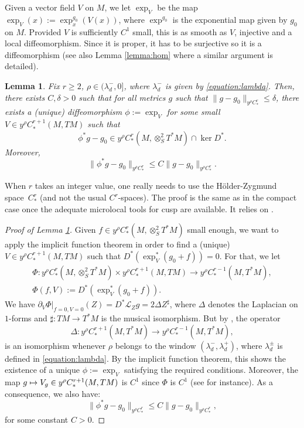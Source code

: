 \documentclass[10pt]{amsart}
\newcommand\mto{\mathchoice{\longmapsto}{\mapsto}{\mapsto}{\mapsto}}
\newcommand{\mc}{\mathcal}
\theoremstyle{plain}
\newtheorem{lemma}{Lemma}[section]
\theoremstyle{definition}
\begin{document}
Given a vector field $V$ on $M$, we let $\exp_V$ be the map $\exp_V(x) := \exp_x^{g_0}(V(x))$, where $\exp^{g_0}$ is the exponential map given by $g_0$ on $M$. Provided $V$ is sufficiently $C^1$ small, this is as smooth as $V$, injective and a local diffeomorphism. Since it is proper, it has to be surjective so it is a diffeomorphism (see also Lemma \ref{lemma:hom} where a similar argument is detailed).

\begin{lemma}
\label{lemma:solenoidal-reduction}
Fix $r \geq 2$, $\rho \in (\lambda_d^-,0]$, where $\lambda_d^-$ is given by \eqref{equation:lambda}. Then, there exists $C, \delta > 0$ such that for all metrics $g$ such that $\|g-g_0\|_{y^{\rho}C^r_*} \leq \delta$, there exists a (unique) diffeomorphism $\phi := \exp_V$ for some small $V \in y^{\rho}C^{r+1}_*(M,TM)$ such that
\[
\phi^*g-g_0 \in y^{\rho}C^r_*(M,\otimes^2_S T^*M) \cap \ker D^*.
\]
Moreover,
\begin{equation}
\label{equation:kikoo}
\|\phi^*g-g_0\|_{y^\rho C^r_*} \leq C \|g-g_0\|_{y^\rho C^r_*}.
\end{equation}
\end{lemma}

When $r$ takes an integer value, one really needs to use the Hölder-Zygmund space~$C^r_*$ (and not the usual $C^r$-spaces). The proof is the same as in the compact case once the adequate microlocal tools for cusp are available. It relies on \cite[Lem.\,5.4]{Bonthonneau-Lefeuvre-19-1}.

\begin{proof}[Proof of Lemma \ref{lemma:solenoidal-reduction}]
Given $f \in y^{\rho}C^r_*(M,\otimes^2_S T^*M)$ small enough, we want to apply the implicit function theorem in order to find a (unique) $V \in y^{\rho}C^{r+1}_*(M,TM)$ such that $D^*(\exp_V^*(g_0+f)) = 0$. For that, we let
\begin{gather*}
\Phi : y^{\rho}C^r_*(M,\otimes^2_S T^*M) \times y^{\rho}C^{r+1}_*(M,TM) \to y^{\rho}C^{r-1}_*(M,T^*M), \\
\Phi(f,V) := D^*(\exp_V^*(g_0+f)).
\end{gather*}
We have $\partial_V \Phi|_{f=0, V=0}(Z) = D^* \mc{L}_Z g = 2 \Delta Z^\sharp$, where $\Delta$ denotes the Laplacian on $1$\nobreakdash-forms and $\sharp : TM \to T^*M$ is the musical isomorphism. But by \cite[Lem.\,5.4]{Bonthonneau-Lefeuvre-19-1}, the operator
\[
\Delta : y^{\rho}C^{r+1}_*(M,T^*M) \to y^{\rho}C^{r-1}_*(M,T^*M),
\]
is an isomorphism whenever $\rho$ belongs to the window $(\lambda_d^-,\lambda_d^+)$, where $\lambda_d^\pm$ is defined in \eqref{equation:lambda}. By the implicit function theorem, this shows the existence of a unique $\phi := \exp_V$ satisfying the required conditions. Moreover, the map $g \mto V_g \in y^\rho C^{r+1}_*(M,TM)$ is $C^1$ since $\Phi$ is $C^1$ (see \cite{Guillarmou-Lefeuvre-18} for instance). As a consequence, we also have:
\[
\|\phi^*g-g_0\|_{y^\rho C^r_*} \leq C \|g-g_0\|_{y^\rho C^r_*},
\]
for some constant $C > 0$.
\end{proof}
\end{document}
